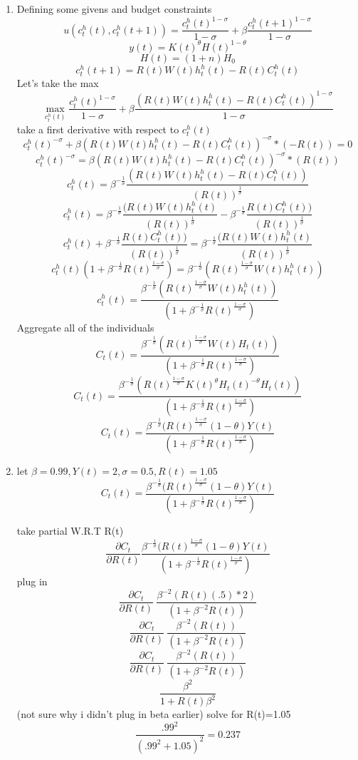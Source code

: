 \begin{enumerate}
    \item Defining some givens and budget constraints  $$u(c^h_t(t),c^h_t(t+1))=\frac{c^h_t(t)^{1-\sigma}}{1-\sigma}+\beta\frac{c^h_t(t+1)^{1-\sigma}}{1-\sigma}$$
    $$y(t)=K(t)^\theta H(t)^{1-\theta}$$
    $$H(t)=(1+n)H_0$$
    $$c_t^h(t+1) = R(t)W(t)h^h_t(t)-R(t)C_t^h(t)$$
    Let's take the max
    $$\max_{c^h_t(t)} \frac{c^h_t(t)^{1-\sigma}}{1-\sigma}+\beta\frac{( R(t)W(t)h^h_t(t)-R(t)C_t^h(t))^{1-\sigma}}{1-\sigma}$$
    take a first derivative with respect to $c_t^h(t)$
    $$c^h_t(t)^{-\sigma}+\beta( R(t)W(t)h^h_t(t)-R(t)C_t^h(t))^{-\sigma}*(-R(t))=0$$
    $$c^h_t(t)^{-\sigma}=\beta( R(t)W(t)h^h_t(t)-R(t)C_t^h(t))^{-\sigma}*(R(t))$$
    $$c^h_t(t)=\beta^{-\frac{1}{\sigma}}\frac{( R(t)W(t)h^h_t(t)-R(t)C_t^h(t))}{(R(t))^{\frac{1}{\sigma}}}$$
    $$c^h_t(t)=\beta^{-\frac{1}{\sigma}}\frac{( R(t)W(t)h^h_t(t)}{(R(t))^\frac{1}{\sigma}}-\beta^{-\frac{1}{\sigma}} \frac{R(t)C_t^h(t))}{(R(t))^{\frac{1}{\sigma}}}$$
    $$c^h_t(t)+\beta^{-\frac{1}{\sigma}} \frac{R(t)C_t^h(t))}{(R(t))^{\frac{1}{\sigma}}}=\beta^{-\frac{1}{\sigma}}\frac{( R(t)W(t)h^h_t(t)}{(R(t))^\frac{1}{\sigma}}$$    
    $$c^h_t(t)(1+\beta^{-\frac{1}{\sigma}} R(t)^{\frac{1-\sigma}{\sigma}})=\beta^{-\frac{1}{\sigma}}( R(t)^{\frac{1-\sigma}{\sigma}}W(t)h^h_t(t))$$
    $$c^h_t(t)=\frac{\beta^{-\frac{1}{\sigma}}( R(t)^{\frac{1-\sigma}{\sigma}}W(t)h^h_t(t))}{(1+\beta^{-\frac{1}{\sigma}} R(t)^{\frac{1-\sigma}{\sigma}})}$$
    Aggregate all of the individuals
    $$C_t(t)=\frac{\beta^{-\frac{1}{\sigma}}( R(t)^{\frac{1-\sigma}{\sigma}}W(t)H_t(t))}{(1+\beta^{-\frac{1}{\sigma}} R(t)^{\frac{1-\sigma}{\sigma}})} $$
    $$C_t(t)=\frac{\beta^{-\frac{1}{\sigma}}( R(t)^{\frac{1-\sigma}{\sigma}}K(t)^{\theta}H_t(t)^{-\theta}H_t(t))}{(1+\beta^{-\frac{1}{\sigma}} R(t)^{\frac{1-\sigma}{\sigma}})} $$
    $$C_t(t)=\frac{\beta^{-\frac{1}{\sigma}}( R(t)^{\frac{1-\sigma}{\sigma}}(1-\theta)Y(t)}{(1+\beta^{-\frac{1}{\sigma}} R(t)^{\frac{1-\sigma}{\sigma}})} $$
    \item 
    let $\beta=0.99, Y(t)=2, \sigma=0.5, R(t)=1.05$
     $$C_t(t)=\frac{\beta^{-\frac{1}{\sigma}}( R(t)^{\frac{1-\sigma}{\sigma}}(1-\theta)Y(t)}{(1+\beta^{-\frac{1}{\sigma}} R(t)^{\frac{1-\sigma}{\sigma}})} $$

    take partial W.R.T R(t)
    $$\frac{\partial C_t}{\partial R(t)} \frac{\beta^{-\frac{1}{\sigma}}( R(t)^{\frac{1-\sigma}{\sigma}}(1-\theta)Y(t)}{(1+\beta^{-\frac{1}{\sigma}} R(t)^{\frac{1-\sigma}{\sigma}})}$$
    plug in
    $$ \frac{\partial C_t}{\partial R(t)} ~ \frac{\beta^{-2}( R(t)(.5)*2)}{(1+\beta^{-2} R(t))}$$
    $$ \frac{\partial C_t}{\partial R(t)} ~ \frac{\beta^{-2}( R(t))}{(1+\beta^{-2} R(t))}$$
    $$ \frac{\partial C_t}{\partial R(t)} ~ \frac{\beta^{-2}( R(t))}{(1+\beta^{-2} R(t))}$$
    $$\frac{\beta^2}{1+R(t)\beta^2}$$ (not sure why i didn't plug in beta earlier)
    solve for R(t)=1.05
    $$\frac{.99^2}{\left(.99^2+1.05\right)^2}=0.237$$
    

\end{enumerate}

